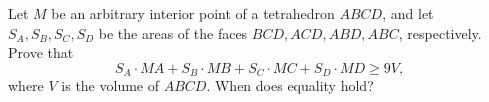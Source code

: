 Let $M$ be an arbitrary interior point of a tetrahedron $ABCD$, and let $S_A,S_B,S_C,S_D$ be the areas of the faces $BCD,ACD,ABD,ABC$, respectively. Prove that
$$S_A\cdot MA+S_B\cdot MB+S_C\cdot MC+S_D\cdot MD\ge9V,$$where $V$ is the volume of $ABCD$. When does equality hold?